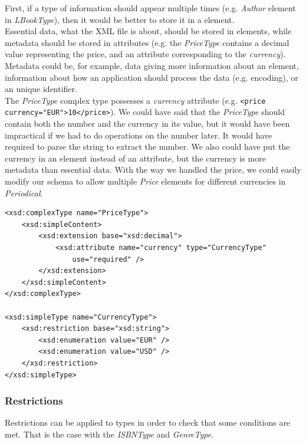 First, if a type of information should appear multiple times (e.g. \emph{Author}
element in \emph{LBookType}), then it would be better to store it in a element.\\

Essential data, what the XML file is about, should be stored in elements, while
metadata should be stored in attributes (e.g. the \emph{PriceType} contains a
decimal value representing the price, and an attribute corresponding to the
\emph{currency}). Metadata could be, for example, data giving more information
about an element, information about how an application should process the data
(e.g. encoding), or an unique identifier.\\

The \emph{PriceType} complex type possesses a \emph{currency} attribute (e.g.
\verb+<price currency="EUR">10</price>+). We could have said that the
\emph{PriceType} should contain both the number and the currency in its
value, but it would have been impractical if we had to do operations on the
number later. It would have required to parse the string to extract the number.
We also could have put the currency in an element instead of an attribute, but
the currency is more metadata than essential data.
With the way we handled the price, we could easily modify our schema to allow
multiple \emph{Price} elements for different currencies in \emph{Periodical}.

\begin{lstlisting}
<xsd:complexType name="PriceType">
    <xsd:simpleContent>
        <xsd:extension base="xsd:decimal">
            <xsd:attribute name="currency" type="CurrencyType"
                use="required" />
        </xsd:extension>
    </xsd:simpleContent>
</xsd:complexType>

<xsd:simpleType name="CurrencyType">
    <xsd:restriction base="xsd:string">
        <xsd:enumeration value="EUR" />
        <xsd:enumeration value="USD" />
    </xsd:restriction>
</xsd:simpleType>
\end{lstlisting}

\subsubsection{Restrictions}

Restrictions can be applied to types in order to check that some conditions
are met. That is the case with the \emph{ISBNType} and \emph{GenreType}.\\

